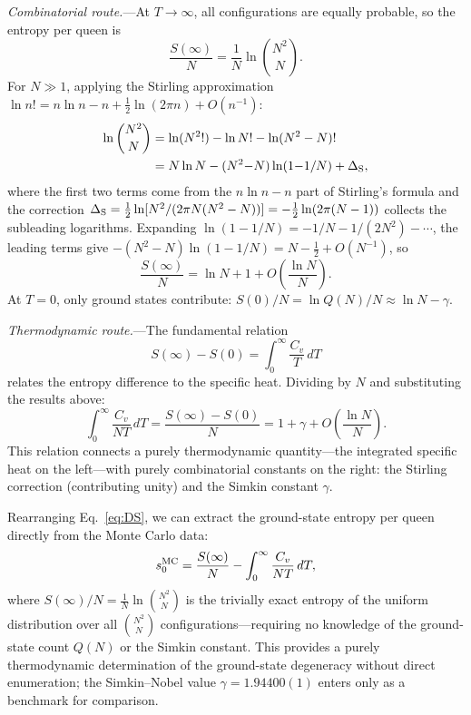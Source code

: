 \documentclass[aps, pre, reprint, amsmath, amssymb, superscriptaddress, floatfix]{revtex4-2}
\begin{document}
\textit{Combinatorial route.}---At $T \to \infty$, all configurations
are equally probable, so the entropy per queen is
\begin{equation}
  \frac{S(\infty)}{N}
  = \frac{1}{N}\ln\binom{N^2}{N}.
  \label{eq:Sinf_def}
\end{equation}
For $N \gg 1$, applying the Stirling approximation
$\ln n! = n\ln n - n + \tfrac{1}{2}\ln(2\pi n) + O(n^{-1})$:
\begin{align}
  \ln\binom{N^2}{N}
  &= \ln(N^2!) - \ln N! - \ln(N^2 - N)! \notag\\
  &= N\ln N - (N^2{-}N)\ln(1{-}1/N)
  + \Delta_{\rm S},
  \label{eq:Sinf_stirling}
\end{align}
where the first two terms come from the $n\ln n - n$ part of Stirling's
formula and the correction
$\Delta_{\rm S} = \tfrac{1}{2}\ln[N^2/(2\pi N(N^2-N))]
= -\tfrac{1}{2}\ln(2\pi(N-1))$ collects the subleading logarithms.
Expanding $\ln(1 - 1/N) = -1/N - 1/(2N^2) - \cdots$, the
leading terms give $-(N^2-N)\ln(1-1/N) = N - \tfrac{1}{2} + O(N^{-1})$,
so
\begin{equation}
  \frac{S(\infty)}{N}
  = \ln N + 1 + O\!\left(\frac{\ln N}{N}\right).
  \label{eq:Sinf}
\end{equation}
At $T = 0$, only ground states contribute:
$S(0)/N = \ln Q(N)/N \approx \ln N - \gamma$.

\textit{Thermodynamic route.}---The fundamental relation
\begin{equation}
  S(\infty) - S(0) = \int_0^\infty \frac{C_v}{T}\,dT
  \label{eq:thermo_int}
\end{equation}
relates the entropy difference to the specific heat.  Dividing by $N$
and substituting the results above:
\begin{equation}
  \int_0^\infty \frac{C_v}{NT}\,dT
  = \frac{S(\infty) - S(0)}{N}
  = 1 + \gamma + O\!\left(\frac{\ln N}{N}\right).
  \label{eq:DS}
\end{equation}
This relation connects a purely thermodynamic quantity---the
integrated specific heat on the left---with purely combinatorial
constants on the right: the Stirling correction (contributing unity)
and the Simkin constant $\gamma$.

Rearranging Eq.~\eqref{eq:DS}, we can extract the ground-state
entropy per queen directly from the Monte Carlo data:
\begin{equation}
  s_0^{\rm MC}
  = \frac{S(\infty)}{N} - \int_0^\infty \frac{C_v}{NT}\,dT,
  \label{eq:s0_MC}
\end{equation}
where $S(\infty)/N = \frac{1}{N}\ln\binom{N^2}{N}$ is the trivially
exact entropy of the uniform distribution over all $\binom{N^2}{N}$
configurations---requiring no knowledge of the ground-state count
$Q(N)$ or the Simkin constant.
This provides a purely thermodynamic determination of the
ground-state degeneracy without direct enumeration; the Simkin--Nobel
value $\gamma = 1.94400(1)$ enters only as a benchmark for comparison.
\end{document}
